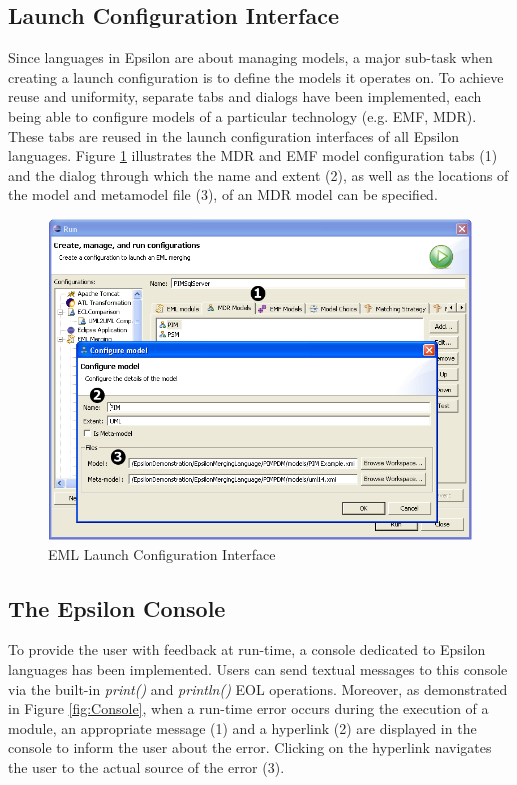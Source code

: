 \subsection{Launch Configuration Interface}
Since languages in Epsilon are about managing models, a major sub-task when creating a launch configuration is to define the models it operates on. To achieve reuse and uniformity, separate tabs and dialogs have been implemented, each being able to configure models of a particular technology (e.g. EMF, MDR). These tabs are reused in the launch configuration interfaces of all Epsilon languages. Figure \ref{fig:LaunchConfiguration} illustrates the MDR and EMF model configuration tabs (1) and the dialog through which the name and extent (2), as well as the locations of the model and metamodel file (3), of an MDR model can be specified.

\begin{figure}
	\centering
		\includegraphics[width=1.0\textwidth]{images/LaunchConfiguration.png}
	\caption{EML Launch Configuration Interface}
	\label{fig:LaunchConfiguration}
\end{figure}

\subsection{The Epsilon Console}
To provide the user with feedback at run-time, a console dedicated to Epsilon languages has been implemented. Users can send textual messages to this console via the built-in \emph{print()} and \emph{println()} EOL operations. Moreover, as demonstrated in Figure \ref{fig:Console}, when a run-time error occurs during the execution of a module, an appropriate message (1) and a hyperlink (2) are displayed in the console to inform the user about the error. Clicking on the hyperlink navigates the user to the actual source of the error (3).

